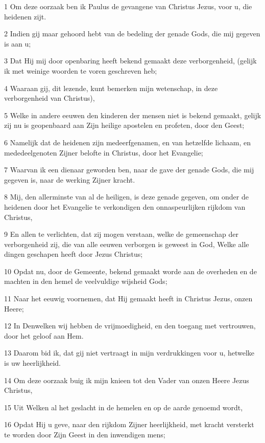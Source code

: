 \par 1 Om deze oorzaak ben ik Paulus de gevangene van Christus Jezus, voor u, die heidenen zijt.
\par 2 Indien gij maar gehoord hebt van de bedeling der genade Gods, die mij gegeven is aan u;
\par 3 Dat Hij mij door openbaring heeft bekend gemaakt deze verborgenheid, (gelijk ik met weinige woorden te voren geschreven heb;
\par 4 Waaraan gij, dit lezende, kunt bemerken mijn wetenschap, in deze verborgenheid van Christus),
\par 5 Welke in andere eeuwen den kinderen der mensen niet is bekend gemaakt, gelijk zij nu is geopenbaard aan Zijn heilige apostelen en profeten, door den Geest;
\par 6 Namelijk dat de heidenen zijn medeerfgenamen, en van hetzelfde lichaam, en mededeelgenoten Zijner belofte in Christus, door het Evangelie;
\par 7 Waarvan ik een dienaar geworden ben, naar de gave der genade Gods, die mij gegeven is, naar de werking Zijner kracht.
\par 8 Mij, den allerminste van al de heiligen, is deze genade gegeven, om onder de heidenen door het Evangelie te verkondigen den onnaspeurlijken rijkdom van Christus,
\par 9 En allen te verlichten, dat zij mogen verstaan, welke de gemeenschap der verborgenheid zij, die van alle eeuwen verborgen is geweest in God, Welke alle dingen geschapen heeft door Jezus Christus;
\par 10 Opdat nu, door de Gemeente, bekend gemaakt worde aan de overheden en de machten in den hemel de veelvuldige wijsheid Gods;
\par 11 Naar het eeuwig voornemen, dat Hij gemaakt heeft in Christus Jezus, onzen Heere;
\par 12 In Denwelken wij hebben de vrijmoedigheid, en den toegang met vertrouwen, door het geloof aan Hem.
\par 13 Daarom bid ik, dat gij niet vertraagt in mijn verdrukkingen voor u, hetwelke is uw heerlijkheid.
\par 14 Om deze oorzaak buig ik mijn knieen tot den Vader van onzen Heere Jezus Christus,
\par 15 Uit Welken al het geslacht in de hemelen en op de aarde genoemd wordt,
\par 16 Opdat Hij u geve, naar den rijkdom Zijner heerlijkheid, met kracht versterkt te worden door Zijn Geest in den inwendigen mens;
